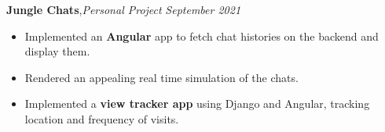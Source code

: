 \textbf{Jungle Chats}\sep{\it Personal Project } \hfill{\sl \small September 2021}\\
\vspace{-8pt}
\begin{itemize}[itemsep = -1.3 mm, leftmargin=*]
\item Implemented an {\bf Angular} app to fetch chat histories on the backend and display them.
\item Rendered an appealing real time simulation of the chats. 
\item Implemented a {\bf view tracker app} using Django and Angular,
 tracking location and frequency of visits.
\end{itemize}
